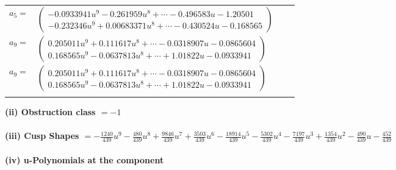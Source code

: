 \documentclass[1p]{elsarticle_modified}
\theoremstyle{definition}
\begin{document}
\begin{tabular}{m{7pt} m{180pt} m{7pt} m{180pt} }
\flushright $a_{5}=$&$\begin{pmatrix}-0.0933941 u^{9}-0.261959 u^{8}+\cdots-0.496583 u-1.20501\\-0.232346 u^{9}+0.00683371 u^{8}+\cdots-0.430524 u-0.168565\end{pmatrix}$ \\
\flushright $a_{9}=$&$\begin{pmatrix}0.205011 u^{9}+0.111617 u^{8}+\cdots-0.0318907 u-0.0865604\\0.168565 u^{9}-0.0637813 u^{8}+\cdots+1.01822 u-0.0933941\end{pmatrix}$\\ \flushright $a_{9}=$&$\begin{pmatrix}0.205011 u^{9}+0.111617 u^{8}+\cdots-0.0318907 u-0.0865604\\0.168565 u^{9}-0.0637813 u^{8}+\cdots+1.01822 u-0.0933941\end{pmatrix}$\\&\end{tabular}
\flushleft \textbf{(ii) Obstruction class $= -1$}\\~\\
\flushleft \textbf{(iii) Cusp Shapes $= -\frac{1240}{439} u^9-\frac{480}{439} u^8+\frac{9846}{439} u^7+\frac{3503}{439} u^6-\frac{18914}{439} u^5-\frac{5302}{439} u^4-\frac{7197}{439} u^3+\frac{1354}{439} u^2-\frac{490}{439} u-\frac{452}{439}$}\\~\\
\newpage\renewcommand{\arraystretch}{1}
\flushleft \textbf{(iv) u-Polynomials at the component}\newline \\
\end{document}
